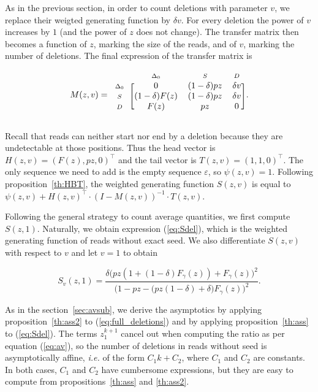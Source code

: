 \documentclass{article}
\newcommand{\smD}{\scriptstyle{D}}
\newcommand{\smS}{\scriptstyle{S}}
\newcommand{\smDELz}{\scriptstyle{\Delta_0}}
\begin{document}
As in the previous section, in order to count deletions with parameter
$v$, we replace their weigted generating function by $\delta v$. For every
deletion the power of $v$ increases by $1$ (and the power of $z$ does not
change). The transfer matrix then becomes a function of $z$, marking the
size of the reads, and of $v$, marking the number of deletions. The final
expression of the transfer matrix is



\begin{equation*}
M(z,v) = 
\begin{blockarray}{cccc}
       & \smDELz & \smS & \smD \\
\begin{block}{c[ccc]}
\smDELz & 0              & (1-\delta)pz & \delta v \\
\smS    & (1-\delta)F(z) & (1-\delta)pz & \delta v \\
\smD    & F(z)           & pz           & 0        \\
\end{block}
\end{blockarray}.
\end{equation*}

Recall that reads can neither start nor end by a deletion because they are
undetectable at those positions. Thus the head vector is $H(z,v) = (F(z),
pz, 0)^\top$ and the tail vector is $T(z,v) = (1,1,0)^\top$. The only
sequence we need to add is the empty sequence $\varepsilon$, so $\psi(z,v)
= 1$. Following proposition~\ref{th:HBT}, the weighted generating function
$S(z,v)$ is equal to $\psi(z,v) + H(z,v)^\top \cdot (I-M(z,v))^{-1} \cdot
T(z,v)$.

Following the general strategy to count average quantities, we first
compute $S(z,1)$. Naturally, we obtain expression (\ref{eq:Sdel}), which
is the weighted generating function of reads without exact seed. We also
differentiate $S(z,v)$ with respect to $v$ and let $v=1$ to obtain

\begin{equation}
\label{eq:full_deletions}
S_v(z,1) =
\frac{\delta\big( pz(1+(1-\delta)F_\gamma(z))+F_\gamma(z) \big)^2}
{\big( 1-pz - \big(pz(1-\delta) + \delta\big)F_\gamma(z) \big)^2}.
\end{equation}

As in the section~\ref{sec:avsub}, we derive the asymptotics by applying
proposition~\ref{th:ass2} to (\ref{eq:full_deletions}) and by applying
proposition~\ref{th:ass} to (\ref{eq:Sdel}). The terms $z_1^{k+1}$ cancel
out when computing the ratio as per equation (\ref{eq:av}), so the number
of deletions in reads without seed is asymptotically affine, \textit{i.e.}
of the form $C_1k+C_2$, where $C_1$ and $C_2$ are constants. In both
cases, $C_1$ and $C_2$ have cumbersome expressions, but they are easy to
compute from propositions~\ref{th:ass} and \ref{th:ass2}.
\end{document}
